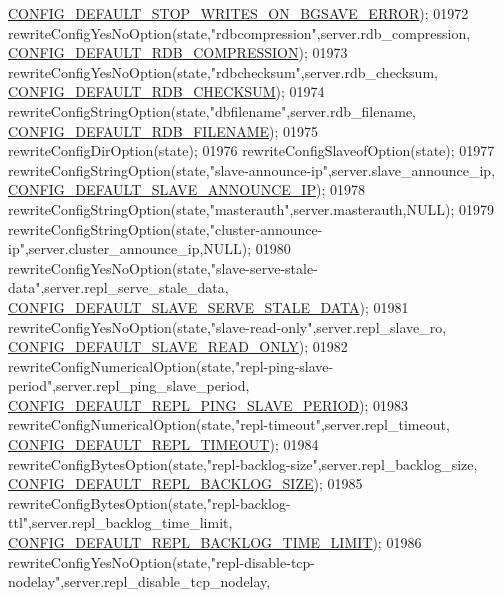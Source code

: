 \begin{DoxyCode}
{{{{{{{{{{{{{{{{{{{{{{{{{{{{      \hyperlink{server_8h_a050e337ffdb94f18e190cc6d6d851196}{CONFIG\_DEFAULT\_STOP\_WRITES\_ON\_BGSAVE\_ERROR});
01972     rewriteConfigYesNoOption(state,\textcolor{stringliteral}{"rdbcompression"},server.rdb\_compression,
      \hyperlink{server_8h_a250e4ab3a143ecbce2603ffaa3a29c0a}{CONFIG\_DEFAULT\_RDB\_COMPRESSION});
01973     rewriteConfigYesNoOption(state,\textcolor{stringliteral}{"rdbchecksum"},server.rdb\_checksum,
      \hyperlink{server_8h_a549382a72b7490f18a44f03e2dbe5568}{CONFIG\_DEFAULT\_RDB\_CHECKSUM});
01974     rewriteConfigStringOption(state,\textcolor{stringliteral}{"dbfilename"},server.rdb\_filename,
      \hyperlink{server_8h_af563e9454f9a1ef49de787e4fc66c448}{CONFIG\_DEFAULT\_RDB\_FILENAME});
01975     rewriteConfigDirOption(state);
01976     rewriteConfigSlaveofOption(state);
01977     rewriteConfigStringOption(state,\textcolor{stringliteral}{"slave-announce-ip"},server.slave\_announce\_ip,
      \hyperlink{server_8h_aca61db3dff4f6e864b3e49d3f087fb51}{CONFIG\_DEFAULT\_SLAVE\_ANNOUNCE\_IP});
01978     rewriteConfigStringOption(state,\textcolor{stringliteral}{"masterauth"},server.masterauth,NULL);
01979     rewriteConfigStringOption(state,\textcolor{stringliteral}{"cluster-announce-ip"},server.cluster\_announce\_ip,NULL);
01980     rewriteConfigYesNoOption(state,\textcolor{stringliteral}{"slave-serve-stale-data"},server.repl\_serve\_stale\_data,
      \hyperlink{server_8h_ab42b23884952f9887529b6efbf0d4ac6}{CONFIG\_DEFAULT\_SLAVE\_SERVE\_STALE\_DATA});
01981     rewriteConfigYesNoOption(state,\textcolor{stringliteral}{"slave-read-only"},server.repl\_slave\_ro,
      \hyperlink{server_8h_af9b93e225d47183c97bc1f86db1aff2a}{CONFIG\_DEFAULT\_SLAVE\_READ\_ONLY});
01982     rewriteConfigNumericalOption(state,\textcolor{stringliteral}{"repl-ping-slave-period"},server.repl\_ping\_slave\_period,
      \hyperlink{server_8h_a5496312872886690751d1e4a248026e9}{CONFIG\_DEFAULT\_REPL\_PING\_SLAVE\_PERIOD});
01983     rewriteConfigNumericalOption(state,\textcolor{stringliteral}{"repl-timeout"},server.repl\_timeout,
      \hyperlink{server_8h_a7608d2301c8447e2237ba173d8eef88e}{CONFIG\_DEFAULT\_REPL\_TIMEOUT});
01984     rewriteConfigBytesOption(state,\textcolor{stringliteral}{"repl-backlog-size"},server.repl\_backlog\_size,
      \hyperlink{server_8h_a6ac2fd3dd83df43a6b262bab091bc371}{CONFIG\_DEFAULT\_REPL\_BACKLOG\_SIZE});
01985     rewriteConfigBytesOption(state,\textcolor{stringliteral}{"repl-backlog-ttl"},server.repl\_backlog\_time\_limit,
      \hyperlink{server_8h_ac5c5c62f45277671484daad919338b5e}{CONFIG\_DEFAULT\_REPL\_BACKLOG\_TIME\_LIMIT});
01986     rewriteConfigYesNoOption(state,\textcolor{stringliteral}{"repl-disable-tcp-nodelay"},server.repl\_disable\_tcp\_nodelay,
}}}}}}}}}}}}}}}}}}}}}}}}}}}}
\end{DoxyCode}
